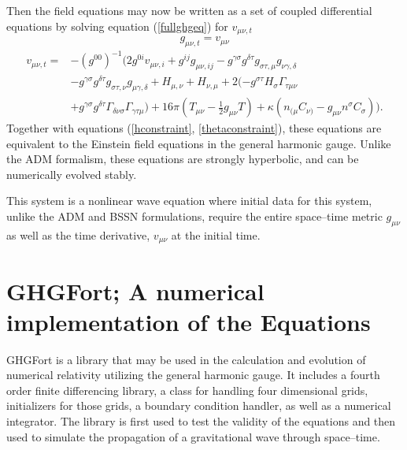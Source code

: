 \documentclass[11pt]{article}
\numberwithin{equation}{section}
\begin{document}
Then the field equations may now be written as a set of coupled differential equations by solving equation (\ref{fullghgeq}) for $v_{\mu\nu,t}$
\begin{equation}
    g_{\mu\nu,t} = v_{\mu\nu} 
\end{equation}
\begin{equation}
\begin{split}\label{dotveq}
    v_{\mu\nu,t} = &-(g^{00})^{-1}(2g^{0i}v_{\mu\nu,i} + g^{ij}g_{\mu\nu,ij} -  g^{\gamma\sigma}g^{\delta\tau}g_{\sigma\tau,\mu}g_{\nu\gamma,\delta} \\
    & - g^{\gamma\sigma}g^{\delta\tau}g_{\sigma\tau,\nu}g_{\mu\gamma,\delta} + H_{\mu,\nu} + H_{\nu,\mu} + 2(-g^{\sigma\tau}H_{\sigma}\Gamma_{\tau\mu\nu} \\
    &+ g^{\gamma\sigma}g^{\delta\tau}\Gamma_{\delta\nu\sigma}\Gamma_{\gamma\tau\mu}) + 16\pi(T_{\mu\nu} - \frac12g_{\mu\nu}T) + \kappa ( n_{(\mu}C_{\nu)} - g_{\mu\nu}n^{\sigma}C_{\sigma}) ).
\end{split}
\end{equation}
Together with equations (\ref{hconstraint}, \ref{thetaconstraint}), these equations are equivalent to the Einstein field equations in the general harmonic gauge. Unlike the ADM formalism, these equations are strongly hyperbolic, and can be numerically evolved stably. 

This system is a nonlinear wave equation where initial data for this system, unlike the ADM and BSSN formulations, require the entire space--time metric $g_{\mu\nu}$ as well as the time derivative, $v_{\mu\nu}$ at the initial time. 

\section{GHGFort; A numerical implementation of the Equations}
GHGFort is a library that may be used in the calculation and evolution of numerical relativity utilizing the general harmonic gauge. It includes a fourth order finite differencing library, a class for handling four dimensional grids, initializers for those grids, a boundary condition handler, as well as a numerical integrator. The library is first used to test the validity of the equations and then used to simulate the propagation of a gravitational wave through space--time.
\end{document}

